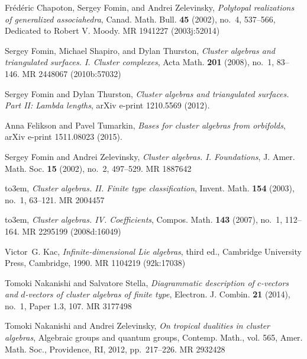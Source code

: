 \documentclass[11pt]{amsart}
\theoremstyle{definition}
\numberwithin{equation}{section}
\numberwithin{figure}{section}
\begin{document}
\providecommand{\bysame}{\leavevmode\hbox to3em{\hrulefill}\thinspace}
\providecommand{\MR}{\relax\ifhmode\unskip\space\fi MR }
\providecommand{\MRhref}[2]{%
  \href{http://www.ams.org/mathscinet-getitem?mr=#1}{#2}
}
\providecommand{\href}[2]{#2}
\begin{thebibliography}{CFZ02}

Fr{\'e}d{\'e}ric Chapoton, Sergey Fomin, and Andrei Zelevinsky, \emph{Polytopal
  realizations of generalized associahedra}, Canad. Math. Bull. \textbf{45}
  (2002), no.~4, 537--566, Dedicated to Robert V. Moody. \MR{1941227
  (2003j:52014)}

Sergey Fomin, Michael Shapiro, and Dylan Thurston, \emph{Cluster algebras and
  triangulated surfaces. {I}. {C}luster complexes}, Acta Math. \textbf{201}
  (2008), no.~1, 83--146. \MR{2448067 (2010b:57032)}

Sergey Fomin and Dylan Thurston, \emph{{Cluster algebras and triangulated
  surfaces. Part II: Lambda lengths}}, arXiv e-print 1210.5569 (2012).

Anna {Felikson} and Pavel {Tumarkin}, \emph{{Bases for cluster algebras from
  orbifolds}}, arXiv e-print 1511.08023 (2015).

Sergey Fomin and Andrei Zelevinsky, \emph{Cluster algebras. {I}.
  {F}oundations}, J. Amer. Math. Soc. \textbf{15} (2002), no.~2, 497--529.
  \MR{1887642}

\bysame, \emph{Cluster algebras. {II}. {F}inite type classification}, Invent.
  Math. \textbf{154} (2003), no.~1, 63--121. \MR{2004457}

\bysame, \emph{Cluster algebras. {IV}. {C}oefficients}, Compos. Math.
  \textbf{143} (2007), no.~1, 112--164. \MR{2295199 (2008d:16049)}

Victor~G. Kac, \emph{Infinite-dimensional {L}ie algebras}, third ed., Cambridge
  University Press, Cambridge, 1990. \MR{1104219 (92k:17038)}

Tomoki Nakanishi and Salvatore Stella, \emph{Diagrammatic description of
  {$c$}-vectors and {$d$}-vectors of cluster algebras of finite type},
  Electron. J. Combin. \textbf{21} (2014), no.~1, Paper 1.3, 107. \MR{3177498}

Tomoki Nakanishi and Andrei Zelevinsky, \emph{On tropical dualities in cluster
  algebras}, Algebraic groups and quantum groups, Contemp. Math., vol. 565,
  Amer. Math. Soc., Providence, RI, 2012, pp.~217--226. \MR{2932428}


\end{thebibliography}
\end{document}
